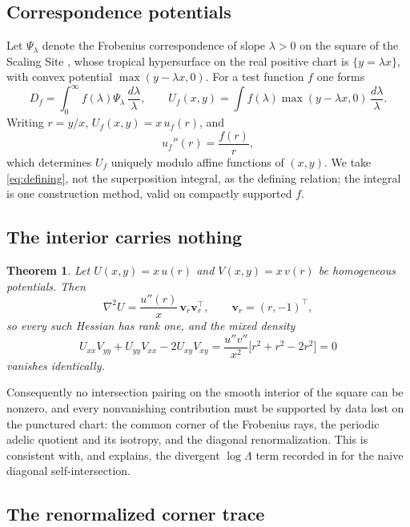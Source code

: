 \documentclass[11pt]{amsart}
\newtheorem{theorem}{Theorem}[section]
\theoremstyle{definition}
\theoremstyle{remark}
\begin{document}
\subsection{Correspondence potentials}

Let $\Psi_\lambda$ denote the Frobenius correspondence of slope $\lambda>0$
on the square of the Scaling Site \cite{CC-ScalingSite,CC-RRstrategy}, whose
tropical hypersurface on the real positive chart is $\{y=\lambda x\}$, with
convex potential $\max(y-\lambda x,0)$.  For a test function $f$ one forms
\begin{equation}
 D_f=\int_0^\infty f(\lambda)\Psi_\lambda\,\frac{d\lambda}{\lambda},
 \qquad
 U_f(x,y)=\int f(\lambda)\max(y-\lambda x,0)\,\frac{d\lambda}{\lambda}.
\end{equation}
Writing $r=y/x$, $U_f(x,y)=x\,u_f(r)$, and
\begin{equation}\label{eq:defining}
 u_f''(r)=\frac{f(r)}{r},
\end{equation}
which determines $U_f$ uniquely modulo affine functions of $(x,y)$.  We take
\eqref{eq:defining}, not the superposition integral, as the defining
relation; the integral is one construction method, valid on compactly
supported $f$.

\subsection{The interior carries nothing}

\begin{theorem}\label{thm:interior}
Let $U(x,y)=x\,u(r)$ and $V(x,y)=x\,v(r)$ be homogeneous potentials.  Then
\[
 \nabla^2U=\frac{u''(r)}{x}\,\mathbf v_r\mathbf v_r^{\!\top},
 \qquad \mathbf v_r=(r,-1)^{\!\top},
\]
so every such Hessian has rank one, and the mixed density
\[
 U_{xx}V_{yy}+U_{yy}V_{xx}-2U_{xy}V_{xy}
 =\frac{u''v''}{x^2}\big[r^2+r^2-2r^2\big]=0
\]
vanishes identically.
\end{theorem}

Consequently no intersection pairing on the smooth interior of the square can
be nonzero, and every nonvanishing contribution must be supported by data
lost on the punctured chart: the common corner of the Frobenius rays, the
periodic adelic quotient and its isotropy, and the diagonal renormalization.
This is consistent with, and explains, the divergent $\log\Lambda$ term
recorded in \cite{CC-RRstrategy} for the naive diagonal self-intersection.

\subsection{The renormalized corner trace}
\end{document}
